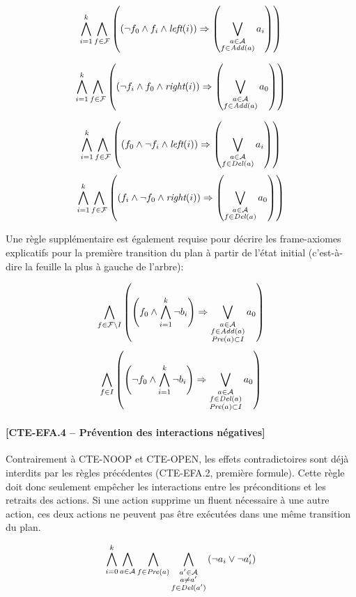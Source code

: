 \begin{small}
\[ \bigwedge\limits_{\substack{i=1}}^{k} \bigwedge\limits_{\substack{f\in \mathcal{F}}}
\left(\left(\neg f_{0} \wedge f_{i} \wedge \textit{left}(i) \right) \Rightarrow \left(\bigvee\limits_{\substack{a \in \mathcal{A} \\ f \in \mathit{Add}(a)}} a_{i}\right)\right)\]

\[ \bigwedge\limits_{\substack{i=1}}^{k} \bigwedge\limits_{\substack{f\in \mathcal{F}}}
\left(\left(\neg f_{i} \wedge f_{0} \wedge \textit{right}(i) \right) \Rightarrow \left(\bigvee\limits_{\substack{a \in \mathcal{A} \\ f \in \mathit{Add}(a)}} a_{0}\right)\right)\]
\end{small}

\begin{small}
\[ \bigwedge\limits_{\substack{i=1}}^{k} \bigwedge\limits_{\substack{f\in \mathcal{F}}}
\left(\left(f_{0} \wedge \neg f_{i} \wedge \textit{left}(i) \right) \Rightarrow \left(\bigvee\limits_{\substack{a \in \mathcal{A} \\ f \in \mathit{Del}(a)}} a_{i}\right)\right)\]
\[ \bigwedge\limits_{\substack{i=1}}^{k} \bigwedge\limits_{\substack{f\in \mathcal{F}}}
\left(\left(f_{i} \wedge \neg f_{0} \wedge \textit{right}(i) \right) \Rightarrow \left(\bigvee\limits_{\substack{a \in \mathcal{A} \\ f \in \mathit{Del}(a)}} a_{0}\right)\right)\]
\end{small}

Une règle supplémentaire est également requise pour décrire les frame-axiomes explicatifs pour la première transition du plan à partir de l'état initial (c'est-à-dire la feuille la plus à gauche de l'arbre):

\[ \bigwedge\limits_{\substack{f\in \mathcal{F}\setminus I}} \left(\left(f_{0}\wedge \bigwedge\limits_{\substack{i=1}}^{k}\neg b_{i}\right) \Rightarrow \bigvee\limits_{\substack{a\in \mathcal{A}\\ f\in\mathit{Add}(a)\\\mathit{Pre}(a) \subset I}} {a}_{0} \right) \]
\[ \bigwedge\limits_{\substack{f\in I}} \left(\left(\neg f_{0}\wedge \bigwedge\limits_{\substack{i=1}}^{k}\neg b_{i}\right) \Rightarrow \bigvee\limits_{\substack{a\in \mathcal{A}\\ f\in\mathit{Del}(a)\\\mathit{Pre}(a) \subset I}} {a}_{0} \right) \]

\paragraph*{[CTE-EFA.4 -- Prévention des interactions négatives]}

Contrairement à CTE-NOOP et CTE-OPEN, les effets contradictoires sont déjà interdits par les règles précédentes (CTE-EFA.2, première formule).
Cette règle doit donc seulement empêcher les interactions entre les préconditions et les retraits des actions. Si une action supprime un fluent nécessaire à une autre action, ces deux actions ne peuvent pas être exécutées dans une même transition du plan.

\[ \bigwedge\limits_{\substack{i=0}}^{k} \bigwedge\limits_{\substack{a \in \mathcal{A}}} \bigwedge\limits_{\substack{f\in \mathit{Pre}(a)}} \bigwedge\limits_{\substack{a' \in \mathcal{A} \\ a \neq a' \\ f \in \mathit{Del}(a')}}\left(\neg a_{i} \vee \neg a'_{i}\right) \]
